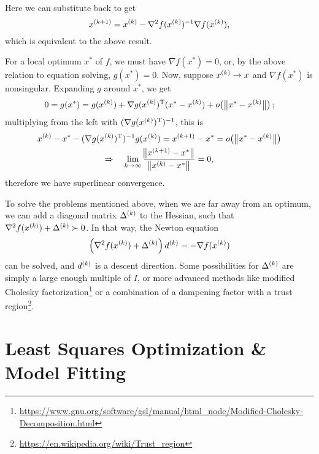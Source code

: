 \documentclass{article}
\begin{document}
Here we can substitute back to get
\begin{equation*}
  \kth[k+1]{x} = \kth{x} - \nabla^2 f(\kth{x})^{-1} \nabla f(\kth{x}),
\end{equation*}
which is equivalent to the above result.

\label{s:newton-local-convergence}

For a local optimum \(x^*\) of \(f\), we must have \(\nabla f(x^*) = 0\), or, by the above relation
to equation solving, \(g(x^*) = 0\).  Now, suppose \(\kth{x} \to x\) and \(\nabla f(x^*)\) is
nonsingular.  Expanding \(g\) around \(x^*\), we get
\begin{equation*}
  0 = g(x^*) = g(\kth{x}) + \T{\nabla g(\kth{x})} (x^* - \kth{x}) + o\!\del[1]{\,\enVert[1]{x^* - \kth{x}}};
\end{equation*}
multiplying from the left with \((\T{\nabla g(\kth{x})})^{-1}\), this is
\begin{gather*}
  \kth{x} - x^* - (\T{\nabla g(\kth{x})})^{-1} g(\kth{x}) = \kth[k+1]{x} - x^* = o\!\del[1]{\,\enVert[1]{x^* - \kth{x}}} \\
  \Rightarrow \quad \lim_{k \to \infty} \frac{\enVert[1]{\kth[k+1]{x} - x^*}}{\enVert[1]{\kth{x} - x^*}} = 0,
\end{gather*}
therefore we have superlinear convergence.


\label{s:newton-global-convergence}

To solve the problems mentioned above, when we are far away from an optimum, we can add a diagonal
matrix \(\kth{\Delta}\) to the Hessian, such that \(\nabla^2 f(\kth{x}) + \kth{\Delta} \succ 0\).
In that way, the Newton equation
\begin{equation*}
  \left( \nabla^2 f(\kth{x}) + \kth{\Delta} \right) \kth{d} = -\nabla f(\kth{x})
\end{equation*}
can be solved, and \(\kth{d}\) is a descent direction.  Some possibilities for \(\kth{\Delta}\) are
simply a large enough multiple of \(I\), or more advanced methods like modified Cholesky
factorization\footnote{\url{https://www.gnu.org/software/gsl/manual/html_node/Modified-Cholesky-Decomposition.html}}
or a combination of a dampening factor with a trust
region\footnote{\url{https://en.wikipedia.org/wiki/Trust_region}}.


\section{Least Squares Optimization \& Model Fitting}
\end{document}
